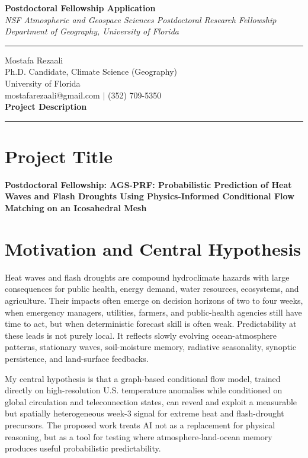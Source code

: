 \documentclass[11pt,letterpaper]{article}
\begin{document}
\begin{center}
    \vspace*{-1.5cm}
    {\Large\bfseries Postdoctoral Fellowship Application} \\[0.2cm]
    {\small\textit{NSF Atmospheric and Geospace Sciences Postdoctoral Research Fellowship}} \\[0.05cm]
    {\small\textit{Department of Geography, University of Florida}} \\[0.1cm]
    \rule{0.6\textwidth}{0.4pt}
\end{center}
\vspace{-0.5cm}

\noindent
Mostafa Rezaali \\
Ph.D. Candidate, Climate Science (Geography) \\
University of Florida \\
mostafarezaali@gmail.com \quad $\mid$ \quad (352) 709-5350 \\[0.3cm]
{\large\bfseries Project Description}\\[-0.15cm]
\rule{\textwidth}{0.4pt}

\section*{Project Title}
\textbf{Postdoctoral Fellowship: AGS-PRF: Probabilistic Prediction of Heat Waves and Flash Droughts Using Physics-Informed Conditional Flow Matching on an Icosahedral Mesh}

\section*{Motivation and Central Hypothesis}
Heat waves and flash droughts are compound hydroclimate hazards with large consequences for public health, energy demand, water resources, ecosystems, and agriculture. Their impacts often emerge on decision horizons of two to four weeks, when emergency managers, utilities, farmers, and public-health agencies still have time to act, but when deterministic forecast skill is often weak. Predictability at these leads is not purely local. It reflects slowly evolving ocean-atmosphere patterns, stationary waves, soil-moisture memory, radiative seasonality, synoptic persistence, and land-surface feedbacks.

My central hypothesis is that a graph-based conditional flow model, trained directly on high-resolution U.S. temperature anomalies while conditioned on global circulation and teleconnection states, can reveal and exploit a measurable but spatially heterogeneous week-3 signal for extreme heat and flash-drought precursors. The proposed work treats AI not as a replacement for physical reasoning, but as a tool for testing where atmosphere-land-ocean memory produces useful probabilistic predictability.
\end{document}
